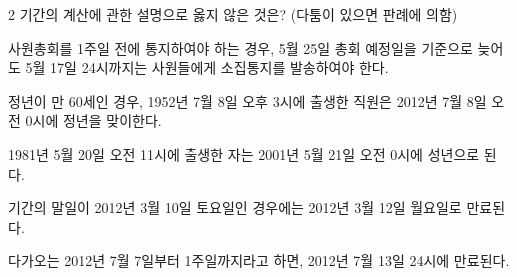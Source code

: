 \begin{question}{2}
기간의 계산에 관한 설명으로 옳지 않은 것은? (다툼이 있으면 판례에 의함)
\begin{choices}
  \item 사원총회를 1주일 전에 통지하여야 하는 경우, 5월 25일 총회 예정일을 기준으로 늦어도 5월 17일 24시까지는 사원들에게 소집통지를 발송하여야 한다.
  \item 정년이 만 60세인 경우, 1952년 7월 8일 오후 3시에 출생한 직원은 2012년 7월 8일 오전 0시에 정년을 맞이한다.
  \item 1981년 5월 20일 오전 11시에 출생한 자는 2001년 5월 21일 오전 0시에 성년으로 된다.
  \item 기간의 말일이 2012년 3월 10일 토요일인 경우에는 2012년 3월 12일 월요일로 만료된다.
  \item 다가오는 2012년 7월 7일부터 1주일까지라고 하면, 2012년 7월 13일 24시에 만료된다.
\end{choices}
\end{question}
